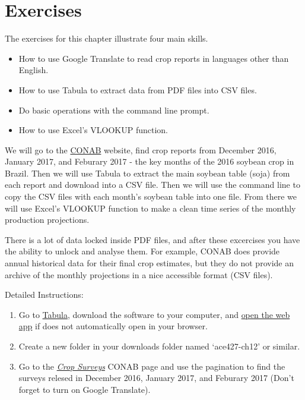 \documentclass[
]{book}
\begin{document}
\hypertarget{exercises-6}{%
\section{Exercises}\label{exercises-6}}

The exercises for this chapter illustrate four main skills.

\begin{itemize}
\item
  How to use Google Translate to read crop reports in languages other than English.
\item
  How to use Tabula to extract data from PDF files into CSV files.
\item
  Do basic operations with the command line prompt.
\item
  How to use Excel's VLOOKUP function.
\end{itemize}

We will go to the \href{http://www.conab.gov.br/index.php}{CONAB} website, find crop reports from December 2016, January 2017, and Feburary 2017 - the key months of the 2016 soybean crop in Brazil. Then we will use Tabula to extract the main soybean table (soja) from each report and download into a CSV file. Then we will use the command line to copy the CSV files with each month's soybean table into one file. From there we will use Excel's VLOOKUP function to make a clean time series of the monthly production projections.

There is a lot of data locked inside PDF files, and after these excercises you have the ability to unlock and analyse them. For example, CONAB does provide annual historical data for their final crop estimates, but they do not provide an archive of the monthly projections in a nice accessible format (CSV files).

Detailed Instructions:

\begin{enumerate}
\def\labelenumi{\arabic{enumi}.}
\item
  Go to \href{http://tabula.technology/}{Tabula}, download the software to your computer, and \href{http://localhost:8080}{open the web app} if does not automatically open in your browser.
\item
  Create a new folder in your downloads folder named `ace427-ch12' or similar.
\item
  Go to the \href{http://www.conab.gov.br/conteudos.php?a=1253\&t=2}{\emph{Crop Surveys}} CONAB page and use the pagination to find the surveys relesed in December 2016, January 2017, and Feburary 2017 (Don't forget to turn on Google Translate).
\end{enumerate}
\end{document}
